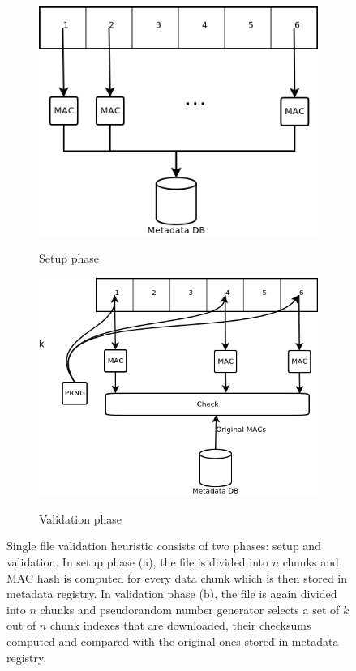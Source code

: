 \begin{figure}
	\begin{subfigure}[h!]{0.45\textwidth}
		\centering
		\includegraphics[width=\textwidth]{images/algorithm-setup.png}
		\label{fig:setup}
		\caption{Setup phase}
	\end{subfigure}
	\begin{subfigure}[h!]{0.45\textwidth}
		\centering
		\includegraphics[width=\textwidth]{images/algorithm-validation.png}
		\label{fig:validation}
		\caption{Validation phase}
	\end{subfigure}
	\caption{Single file validation heuristic consists of two phases: setup
	and validation. In setup phase (a), the file is divided into $n$ chunks and
	MAC hash is computed for every data chunk which is then stored in metadata
	registry. In validation phase (b), the file is again divided into $n$
	chunks and pseudorandom number generator selects a set of $k$ out of $n$
	chunk indexes that are downloaded, their checksums computed and compared
	with the original ones stored in metadata registry.}
	\label{fig:algorithm-scheme}
\end{figure}

